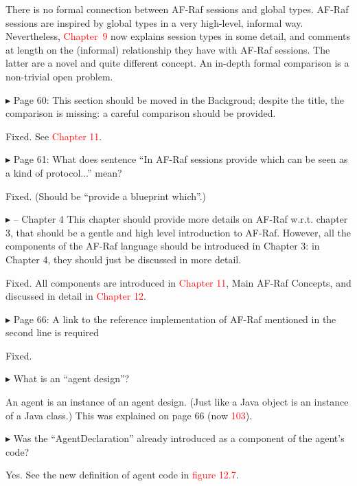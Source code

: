 \documentclass{article}
\newcommand*\R[1]{\textcolor{red}{#1}} %
\newenvironment{them}%
  {\bigskip\noindent\begingroup\color{blue}$\blacktriangleright$\enspace}%
  {\endgroup\par}
\begin{document}
There is no formal connection between AF-Raf sessions and global types.
AF-Raf sessions are inspired by global types in a very high-level,
  informal way.
Nevertheless,
  \R{Chapter~9} now explains session types in some detail,
  and comments at length on the (informal) relationship they have with
    AF-Raf sessions.
The latter are a novel and quite different concept.
An in-depth formal comparison is a non-trivial open problem.


\begin{them}
Page 60:
This section should be moved in the Backgroud; despite the title, the
comparison is missing: a careful comparison should be provided.
\end{them}
Fixed. See \R{Chapter 11}.

\begin{them}
Page 61:
What does sentence ``In AF-Raf sessions provide which can be seen as a kind of
protocol...'' mean?
\end{them}
Fixed.
(Should be ``provide a blueprint which''.)

\begin{them}
-- Chapter 4
This chapter should provide more details on AF-Raf w.r.t. chapter 3, that
should be a gentle and high level introduction to AF-Raf. However, all the
components of the AF-Raf language should be introduced in Chapter 3: in Chapter
4, they should just be discussed in more detail.
\end{them}
Fixed. All components are introduced in \R{Chapter 11}, Main AF-Raf Concepts, and discussed in detail in \R{Chapter 12}.

\begin{them}
Page 66:
A link to the reference implementation of AF-Raf mentioned in the second line
is required
\end{them}
Fixed.

\begin{them}
What is an ``agent design''? 
\end{them}

An agent is an instance of an agent design.
(Just like a Java object is an instance of a Java class.)
This was explained on page 66 (now \R{103}).

\begin{them}
Was the ``AgentDeclaration'' already introduced as a component of the agent's
code?
\end{them}
Yes. See the new definition of agent code in \R{figure 12.7}.
\end{document}
